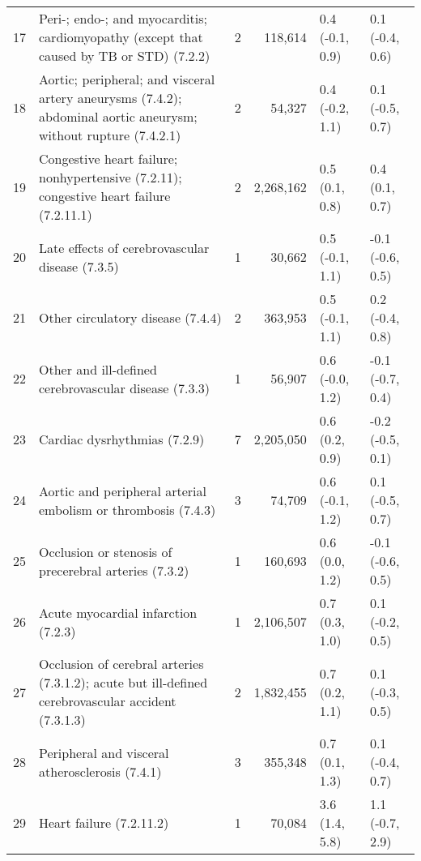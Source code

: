 \begin{tabular}{lp{6.5cm}rrp{2.2cm}p{2.2cm}}
  17 & Peri-; endo-; and myocarditis; cardiomyopathy (except that caused by TB or STD) (7.2.2) &  2 & 118,614 & 0.4 (-0.1, 0.9) & 0.1 (-0.4, 0.6) \\ 
  18 & Aortic; peripheral; and visceral artery aneurysms (7.4.2); abdominal aortic aneurysm; without rupture (7.4.2.1) &  2 & 54,327 & 0.4 (-0.2, 1.1) & 0.1 (-0.5, 0.7) \\ 
  19 & Congestive heart failure; nonhypertensive (7.2.11); congestive heart failure (7.2.11.1) &  2 & 2,268,162 & 0.5 (0.1, 0.8) & 0.4 (0.1, 0.7) \\ 
  20 & Late effects of cerebrovascular disease (7.3.5) &  1 & 30,662 & 0.5 (-0.1, 1.1) & -0.1 (-0.6, 0.5) \\ 
  21 & Other circulatory disease (7.4.4) &  2 & 363,953 & 0.5 (-0.1, 1.1) & 0.2 (-0.4, 0.8) \\ 
  22 & Other and ill-defined cerebrovascular disease (7.3.3) &  1 & 56,907 & 0.6 (-0.0, 1.2) & -0.1 (-0.7, 0.4) \\ 
  23 & Cardiac dysrhythmias (7.2.9) &  7 & 2,205,050 & 0.6 (0.2, 0.9) & -0.2 (-0.5, 0.1) \\ 
  24 & Aortic and peripheral arterial embolism or thrombosis (7.4.3) &  3 & 74,709 & 0.6 (-0.1, 1.2) & 0.1 (-0.5, 0.7) \\ 
  25 & Occlusion or stenosis of precerebral arteries (7.3.2) &  1 & 160,693 & 0.6 (0.0, 1.2) & -0.1 (-0.6, 0.5) \\ 
  26 & Acute myocardial infarction (7.2.3) &  1 & 2,106,507 & 0.7 (0.3, 1.0) & 0.1 (-0.2, 0.5) \\ 
  27 & Occlusion of cerebral arteries (7.3.1.2); acute but ill-defined cerebrovascular accident (7.3.1.3) &  2 & 1,832,455 & 0.7 (0.2, 1.1) & 0.1 (-0.3, 0.5) \\ 
  28 & Peripheral and visceral atherosclerosis (7.4.1) &  3 & 355,348 & 0.7 (0.1, 1.3) & 0.1 (-0.4, 0.7) \\ 
  29 & Heart failure (7.2.11.2) &  1 & 70,084 & 3.6 (1.4, 5.8) & 1.1 (-0.7, 2.9) \\ 
   \hline
\end{tabular}

